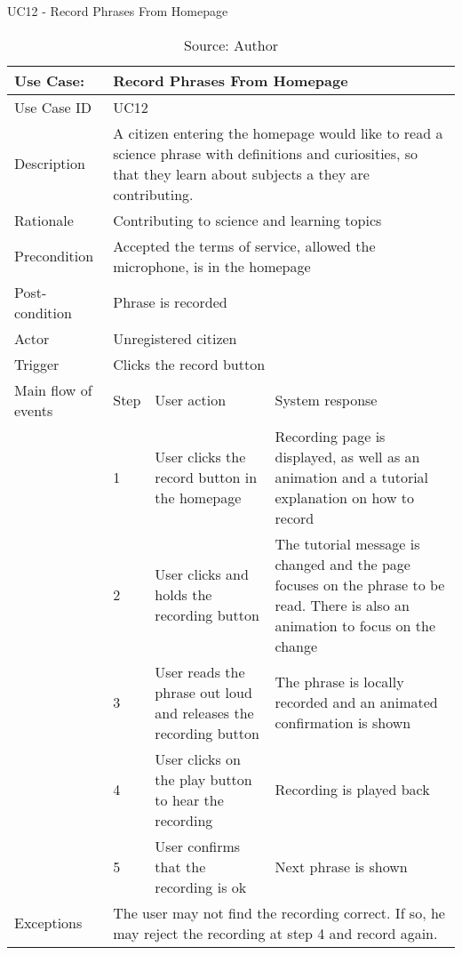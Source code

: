 \begin{table}[h]
\centering
\caption{UC12 - Record Phrases From Homepage}
\label{uc:12}
\begin{tabular}{|p{3cm}|p{1cm}|p{5cm}|p{5cm}|}
\hline
Use Case:       & \multicolumn{3}{p{11cm}|}{Record Phrases From Homepage} \\ \hline
Use Case ID     & \multicolumn{3}{p{11cm}|}{UC12} \\ \hline
Description     & \multicolumn{3}{p{11cm}|}{A citizen entering the homepage would like to read a science phrase with definitions and curiosities, so that they learn about subjects a they are contributing.} \\ \hline
Rationale       & \multicolumn{3}{p{11cm}|}{Contributing to science and learning topics} \\ \hline
Precondition    & \multicolumn{3}{p{11cm}|}{Accepted the terms of service, allowed the microphone, is in the homepage} \\ \hline
Post-condition  & \multicolumn{3}{p{11cm}|}{Phrase is recorded} \\ \hline
Actor           & \multicolumn{3}{p{11cm}|}{Unregistered citizen} \\ \hline
Trigger         & \multicolumn{3}{p{11cm}|}{Clicks the record button} \\ \hline
Main flow of events & Step  & User action & System response \\ \hline
                    & 1     & User clicks the record button in the homepage & Recording page is displayed, as well as an animation and a tutorial explanation on how to record \\ \hline
                    & 2     & User clicks and holds the recording button & The tutorial message is changed and the page focuses on the phrase to be read. There is also an animation to focus on the change \\ \hline
                    & 3     & User reads the phrase out loud and releases the recording button & The phrase is locally recorded and an animated confirmation is shown \\ \hline
                    & 4     & User clicks on the play button to hear the recording & Recording is played back \\ \hline
                    & 5     & User confirms that the recording is ok & Next phrase is shown \\ \hline
Exceptions      & \multicolumn{3}{p{11cm}|}{The user may not find the recording correct. If so, he may reject the recording at step 4 and record again.} \\ \hline
\end{tabular}
\caption*{Source: Author}
\end{table}

